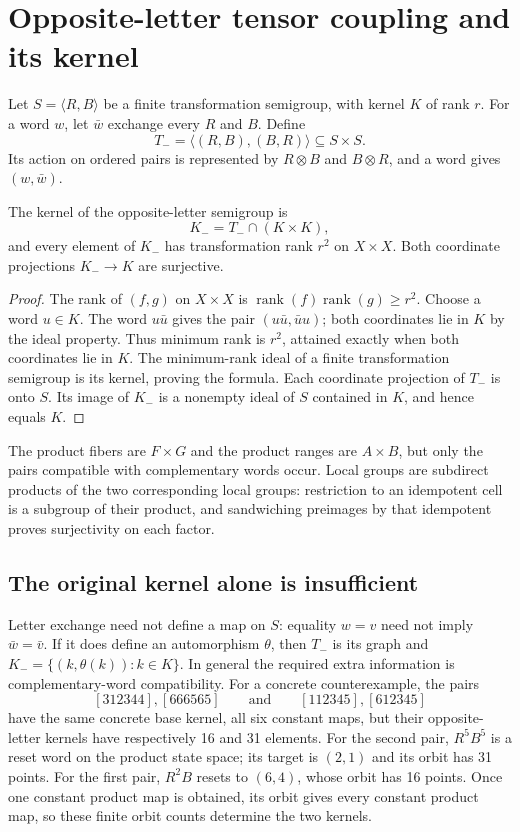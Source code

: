 \section{Opposite-letter tensor coupling and its kernel}
\label{opp-tensor:section}

Let $S=\langle R,B\rangle$ be a finite transformation semigroup, with
kernel $K$ of rank $r$. For a word $w$, let $\bar w$ exchange every $R$
and $B$. Define
\[
 T_-=\langle(R,B),(B,R)\rangle\subseteq S\times S.
\]
Its action on ordered pairs is represented by $R\otimes B$ and
$B\otimes R$, and a word gives $(w,\bar w)$.

\begin{theorem}\label{opp-tensor:kernel}
The kernel of the opposite-letter semigroup is
\[
 K_-=T_-\cap(K\times K),
\]
and every element of $K_-$ has transformation rank $r^2$ on $X\times X$.
Both coordinate projections $K_-\to K$ are surjective.
\end{theorem}
\begin{proof}
The rank of $(f,g)$ on $X\times X$ is
$\operatorname{rank}(f)\operatorname{rank}(g)\ge r^2$.
Choose a word $u\in K$. The word $u\bar u$ gives the pair
$(u\bar u,\bar u u)$; both coordinates lie in $K$ by the ideal property.
Thus minimum rank is $r^2$, attained exactly when both coordinates lie
in $K$. The minimum-rank ideal of a finite transformation semigroup is
its kernel, proving the formula. Each coordinate projection of $T_-$
is onto $S$. Its image of $K_-$ is a nonempty ideal of $S$ contained in
$K$, and hence equals $K$.
\end{proof}
The product fibers are $F\times G$ and the product ranges are
$A\times B$, but only the pairs compatible with complementary words occur.
Local groups are subdirect products of the two corresponding local groups:
restriction to an idempotent cell is a subgroup of their product, and
sandwiching preimages by that idempotent proves surjectivity on each factor.

\subsection{The original kernel alone is insufficient}
Letter exchange need not define a map on $S$: equality $w=v$ need not
imply $\bar w=\bar v$. If it does define an automorphism $\theta$, then
$T_-$ is its graph and $K_-=\{(k,\theta(k)):k\in K\}$.
In general the required extra information is complementary-word compatibility.
For a concrete counterexample, the pairs
\[
 [312344],[666565]\qquad\text{and}\qquad [112345],[612345]
\]
have the same concrete base kernel, all six constant maps, but their
opposite-letter kernels have respectively 16 and 31 elements.
For the second pair, $R^5B^5$ is a reset word on the product state space;
its target is $(2,1)$ and its orbit has 31 points. For the first pair,
$R^2B$ resets to $(6,4)$, whose orbit has 16 points. Once one constant
product map is obtained, its orbit gives every constant product map,
so these finite orbit counts determine the two kernels.

